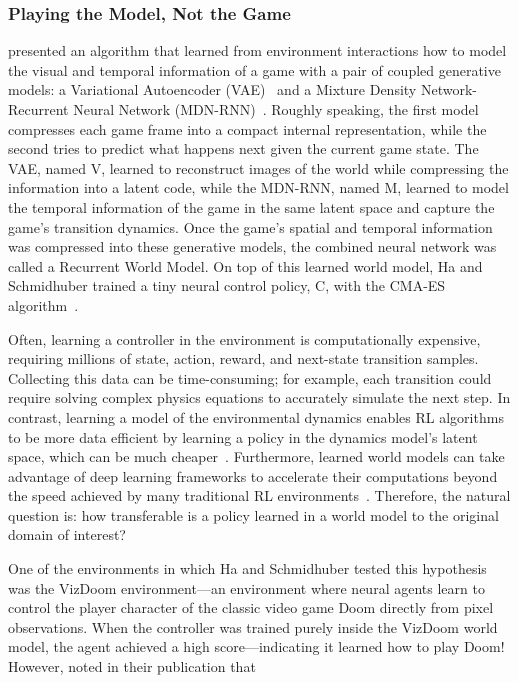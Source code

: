 \subsubsection{Playing the Model, Not the Game~\citep{ha2018world}}
\label{sec:worldmodels}
\citet{ha2018world} presented an algorithm that learned from environment interactions how to model the visual and temporal information of a game with a pair of coupled generative models: a Variational Autoencoder (VAE)~\citep{kingma2022autoencodingvariationalbayes} and a Mixture Density Network-Recurrent Neural Network (MDN-RNN)~\citep{bishopMDN, graves2014generatingsequencesrecurrentneural}. Roughly speaking, the first model compresses each game frame into a compact internal representation, while the second tries to predict what happens next given the current game state. The VAE, named V, learned to reconstruct images of the world while compressing the information into a latent code, while the MDN-RNN, named M, learned to model the temporal information of the game in the same latent space and capture the game's transition dynamics.
Once the game's spatial and temporal information was compressed into these generative models, the combined neural network was called a Recurrent World Model.
On top of this learned world model, Ha and Schmidhuber trained a tiny neural control policy, C, with the CMA-ES algorithm~\citep{hansen2023cmaevolutionstrategytutorial}.

Often, learning a controller in the environment is computationally expensive, requiring millions of state, action, reward, and next-state transition samples. 
Collecting this data can be time-consuming; for example, each transition could require solving complex physics equations to accurately simulate the next step. 
In contrast, learning a model of the environmental dynamics enables RL algorithms to be more data efficient by learning a policy in the dynamics model's latent space, which can be much cheaper~\citep{watterembed2control2015, hafner2024masteringdiversedomainsworld}.
Furthermore, learned world models can take advantage of deep learning frameworks to accelerate their computations beyond the speed achieved by many traditional RL environments~\citep{kaiser2024modelbasedreinforcementlearningatari}.
Therefore, the natural question is:
how transferable is a policy learned in a world model to the original domain of interest? 

One of the environments in which Ha and Schmidhuber tested this hypothesis was the VizDoom environment---an environment where neural agents learn to control the player character of the classic video game Doom directly from pixel observations.
When the controller was trained purely inside the VizDoom world model, the agent achieved a high score---indicating it learned how to play Doom!
However, \citet{ha2018world} noted in their publication that

